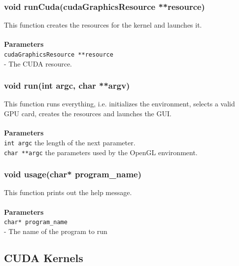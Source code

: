 \documentclass[a4paper, 10pt]{article}
\def\mar{\hspace*{5mm}}
\begin{document}
        \vspace{1cm}
        \subsubsection{void runCuda(cudaGraphicsResource **resource)}
        This function creates the resources for the kernel and launches it.\\
        \\{\bf Parameters}\\
        \verb|cudaGraphicsResource **resource|\\\mar- The CUDA resource.

        \vspace{1cm}
        \subsubsection{void run(int argc, char **argv)}
        This function runs everything, i.e. initializes the environment, selects
        a valid GPU card, creates the resources and launches the GUI.\\
        \\{\bf Parameters}\\
        \verb|int argc| the length of the next parameter.\\
        \verb|char **argc| the parameters used by the OpenGL environment.\\

        \vspace{1cm}
        \subsubsection{void usage(char* program\_name)}
        This function prints out the help message.\\
        \\{\bf Parameters}\\
        \verb|char* program_name|\\\mar- The name of the program to run
    
    \newpage
    \subsection{CUDA Kernels}
        \vspace{1cm}
\end{document}
